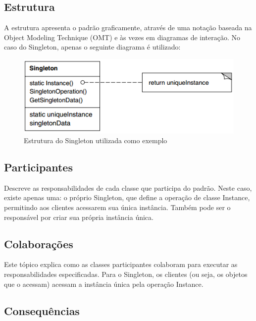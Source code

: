 \subsection*{Estrutura}

A estrutura apresenta o padrão graficamente, através de uma 
notação baseada na Object Modeling Technique (OMT) e às vezes 
em diagramas de interação. No caso do Singleton, apenas o 
seguinte diagrama é utilizado:

\begin{figure}[htb]
	\caption{\label{fig_grafico}Estrutura do Singleton utilizada como exemplo}
	\begin{center}
	    \includegraphics[scale=0.5]{4_referencial_teorico/2_padroes-projeto/singleton_structure.png}
    \end{center}
\end{figure}

\subsection*{Participantes}

Descreve as responsabilidades de cada classe que 
participa do padrão. Neste caso, existe 
apenas uma: o próprio Singleton, que define 
a operação de classe Instance, permitindo aos clientes 
acessarem sua única instância. Também pode ser o 
responsável por criar sua própria instância única.

\subsection*{Colaborações}

Este tópico explica como as classes participantes 
colaboram para executar as responsabilidades 
especificadas. Para o Singleton, os clientes (ou seja, 
os objetos que o acessam) acessam a instância única 
pela operação Instance.

\subsection*{Consequências}

